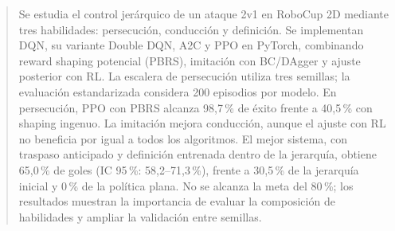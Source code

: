\begin{abstract}
    Se estudia el control jerárquico de un ataque 2v1 en RoboCup 2D mediante
    tres habilidades: persecución, conducción y definición. Se implementan DQN,
    su variante Double DQN, A2C y PPO en PyTorch, combinando reward shaping
    potencial (PBRS), imitación con BC/DAgger y ajuste posterior con RL.
    La escalera de persecución utiliza tres semillas; la evaluación estandarizada
    considera 200 episodios por modelo. En persecución, PPO con PBRS alcanza
    98,7\,\% de éxito frente a 40,5\,\% con shaping ingenuo. La imitación mejora
    conducción, aunque el ajuste con RL no beneficia por igual a todos los
    algoritmos. El mejor sistema, con traspaso anticipado y definición entrenada
    dentro de la jerarquía, obtiene 65,0\,\% de goles (IC 95\,\%: 58,2--71,3\,\%),
    frente a 30,5\,\% de la jerarquía inicial y 0\,\% de la política plana.
    No se alcanza la meta del 80\,\%; los resultados muestran la importancia de
    evaluar la composición de habilidades y ampliar la validación entre semillas.
\end{abstract}
